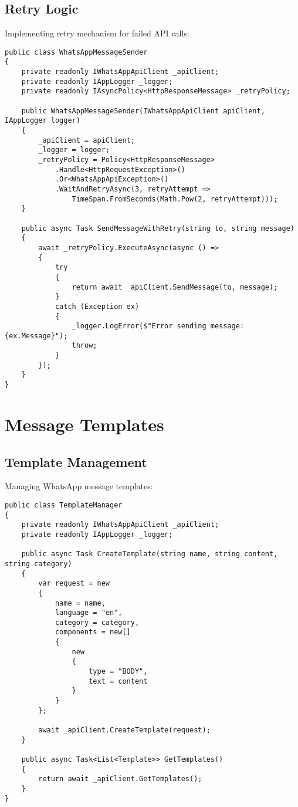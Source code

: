 \subsection{Retry Logic}
Implementing retry mechanism for failed API calls:

\begin{lstlisting}[language=CSharp]
public class WhatsAppMessageSender
{
    private readonly IWhatsAppApiClient _apiClient;
    private readonly IAppLogger _logger;
    private readonly IAsyncPolicy<HttpResponseMessage> _retryPolicy;

    public WhatsAppMessageSender(IWhatsAppApiClient apiClient, IAppLogger logger)
    {
        _apiClient = apiClient;
        _logger = logger;
        _retryPolicy = Policy<HttpResponseMessage>
            .Handle<HttpRequestException>()
            .Or<WhatsAppApiException>()
            .WaitAndRetryAsync(3, retryAttempt =>
                TimeSpan.FromSeconds(Math.Pow(2, retryAttempt)));
    }

    public async Task SendMessageWithRetry(string to, string message)
    {
        await _retryPolicy.ExecuteAsync(async () =>
        {
            try
            {
                return await _apiClient.SendMessage(to, message);
            }
            catch (Exception ex)
            {
                _logger.LogError($"Error sending message: {ex.Message}");
                throw;
            }
        });
    }
}
\end{lstlisting}

\section{Message Templates}

\subsection{Template Management}
Managing WhatsApp message templates:

\begin{lstlisting}[language=CSharp]
public class TemplateManager
{
    private readonly IWhatsAppApiClient _apiClient;
    private readonly IAppLogger _logger;

    public async Task CreateTemplate(string name, string content, string category)
    {
        var request = new
        {
            name = name,
            language = "en",
            category = category,
            components = new[]
            {
                new
                {
                    type = "BODY",
                    text = content
                }
            }
        };

        await _apiClient.CreateTemplate(request);
    }

    public async Task<List<Template>> GetTemplates()
    {
        return await _apiClient.GetTemplates();
    }
}
\end{lstlisting}

